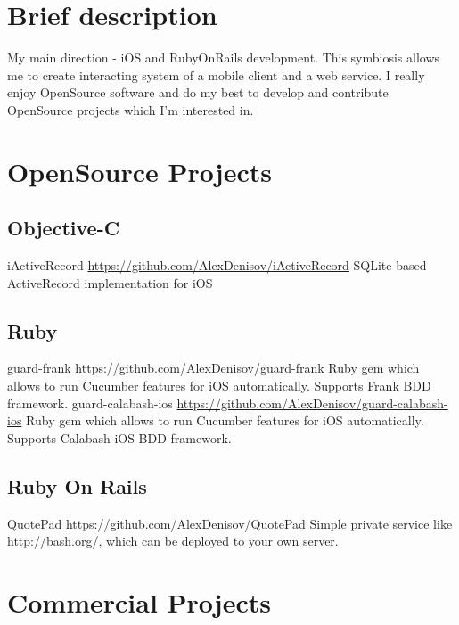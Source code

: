 \documentclass[11pt,a4paper]{moderncv}
\begin{document}
\maketitle

\section{Brief description}
\cvline
  {}
  {My main direction - iOS and RubyOnRails development.\newline{}
  This symbiosis allows me to create interacting system of a mobile client and a web service.\newline{}
  I really enjoy OpenSource software and do my best to develop and contribute OpenSource projects which I'm interested in.}

\section{OpenSource Projects}
\subsection{Objective-C}
\cvline
  {iActiveRecord}
  {\url{https://github.com/AlexDenisov/iActiveRecord}\newline{}
  SQLite-based ActiveRecord implementation for iOS}
\subsection{Ruby}
\cvline
  {guard-frank}
  {\url{https://github.com/AlexDenisov/guard-frank}\newline{}
  Ruby gem which allows to run Cucumber features for iOS automatically.
  \newline{}Supports Frank BDD framework.}
\cvline
  {guard-calabash-ios}
  {\url{https://github.com/AlexDenisov/guard-calabash-ios}\newline{}
  Ruby gem which allows to run Cucumber features for iOS automatically.
  \newline{}Supports Calabash-iOS BDD framework.}
\subsection{Ruby On Rails}
\cvline
  {QuotePad}
  {\url{https://github.com/AlexDenisov/QuotePad}\newline{}
  Simple private service like \url{http://bash.org/}, which can be deployed to your own server.}


\section{Commercial Projects}
\end{document}
